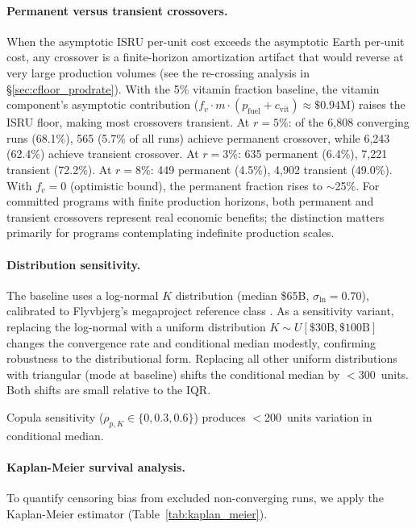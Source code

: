 \documentclass[preprint,12pt]{elsarticle}
\begin{document}
\paragraph{Permanent versus transient crossovers.} When the asymptotic ISRU per-unit cost exceeds the asymptotic Earth per-unit cost, any crossover is a finite-horizon amortization artifact that would reverse at very large production volumes (see the re-crossing analysis in \S\ref{sec:cfloor_prodrate}). With the 5\% vitamin fraction baseline, the vitamin component's asymptotic contribution ($f_v \cdot m \cdot (p_{\mathrm{fuel}} + c_{\mathrm{vit}}) \approx \$0.94$M) raises the ISRU floor, making most crossovers transient. At $r = 5\%$: of the 6{,}808 converging runs (68.1\%), 565 (5.7\% of all runs) achieve permanent crossover, while 6{,}243 (62.4\%) achieve transient crossover. At $r = 3\%$: 635 permanent (6.4\%), 7{,}221 transient (72.2\%). At $r = 8\%$: 449 permanent (4.5\%), 4{,}902 transient (49.0\%). With $f_v = 0$ (optimistic bound), the permanent fraction rises to $\sim$25\%. For committed programs with finite production horizons, both permanent and transient crossovers represent real economic benefits; the distinction matters primarily for programs contemplating indefinite production scales.

\paragraph{Distribution sensitivity.} The baseline uses a log-normal $K$ distribution (median \$65B, $\sigma_{\ln} = 0.70$), calibrated to Flyvbjerg's megaproject reference class \cite{flyvbjerg2014}. As a sensitivity variant, replacing the log-normal with a uniform distribution $K \sim U[\$30\text{B}, \$100\text{B}]$ changes the convergence rate and conditional median modestly, confirming robustness to the distributional form. Replacing all other uniform distributions with triangular (mode at baseline) shifts the conditional median by $<$300~units. Both shifts are small relative to the IQR.

Copula sensitivity ($\rho_{p,K} \in \{0, 0.3, 0.6\}$) produces $<$200~units variation in conditional median.

\paragraph{Kaplan-Meier survival analysis.} To quantify censoring bias from excluded non-converging runs, we apply the Kaplan-Meier estimator \cite{kaplan1958} (Table~\ref{tab:kaplan_meier}).
\end{document}
